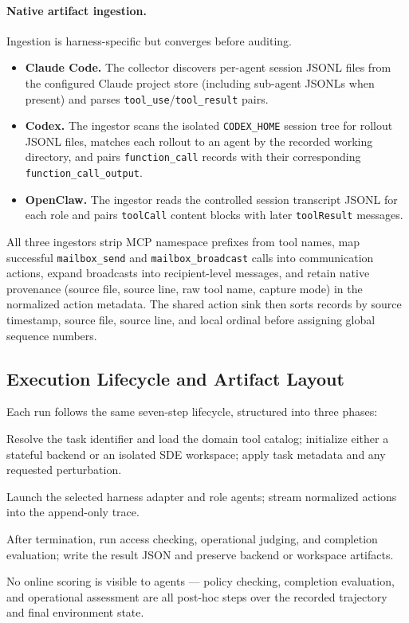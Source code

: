 \paragraph{Native artifact ingestion.}
Ingestion is harness-specific but converges before auditing.
\begin{itemize}[leftmargin=1.2em, itemsep=3pt]
  \item \textbf{Claude Code.} The collector discovers per-agent session
  JSONL files from the configured Claude project store (including sub-agent
  JSONLs when present) and parses \texttt{tool\_use}/\texttt{tool\_result}
  pairs.
  \item \textbf{Codex.} The ingestor scans the isolated \texttt{CODEX\_HOME}
  session tree for rollout JSONL files, matches each rollout to an agent by
  the recorded working directory, and pairs \texttt{function\_call} records
  with their corresponding \texttt{function\_call\_output}.
  \item \textbf{OpenClaw.} The ingestor reads the controlled session
  transcript JSONL for each role and pairs \texttt{toolCall} content blocks
  with later \texttt{toolResult} messages.
\end{itemize}
All three ingestors strip MCP namespace prefixes from tool names, map
successful \texttt{mailbox\_send} and \texttt{mailbox\_broadcast} calls
into communication actions, expand broadcasts into recipient-level
messages, and retain native provenance (source file, source line, raw tool
name, capture mode) in the normalized action metadata. The shared action
sink then sorts records by source timestamp, source file, source line, and
local ordinal before assigning global sequence numbers.

\subsection{Execution Lifecycle and Artifact Layout}
\label{app:pipeline:lifecycle}

Each run follows the same seven-step lifecycle, structured into three
phases:
\begin{description}[leftmargin=1.4em, style=nextline, itemsep=3pt]
  \item[\textsc{Setup} (steps 1--3).] Resolve the task identifier and load
  the domain tool catalog; initialize either a stateful backend or an
  isolated SDE workspace; apply task metadata and any requested
  perturbation.
  \item[\textsc{Run} (steps 4--5).] Launch the selected harness adapter and
  role agents; stream normalized actions into the append-only trace.
  \item[\textsc{Audit} (steps 6--7).] After termination, run access
  checking, operational judging, and completion evaluation; write the
  result JSON and preserve backend or workspace artifacts.
\end{description}
No online scoring is visible to agents --- policy checking, completion
evaluation, and operational assessment are all post-hoc steps over the
recorded trajectory and final environment state.

